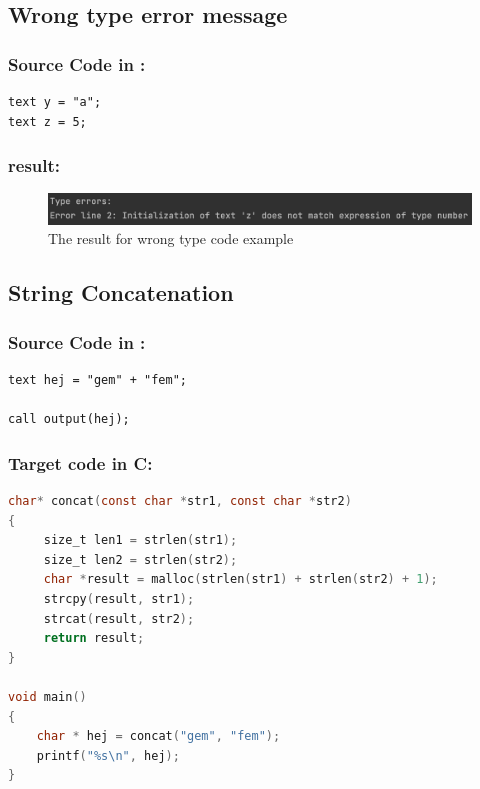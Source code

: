  \subsection{Wrong type error message} \label{test_TypeErr}
\subsubsection{Source Code in \lang:}
\begin{lstlisting}[language = scriptkid, firstnumber=1, label={list:acceptance_test_wrongtype}, caption=Acceptance wrong type code examples]
text y = "a";
text z = 5;
 \end{lstlisting}

 \subsubsection{result:}
\begin{figure}[H] 
    \begin{center}
        \includegraphics[width=1\textwidth]{Files/Billeder: Appendix/errormsg2.png}
    \end{center}
    \caption{The result for wrong type code example}
    \label{figure:errorMsg2_result}
\end{figure}


\subsection{String Concatenation} \label{test_stringconc}

\subsubsection{Source Code in \lang:}
\begin{lstlisting}[language = scriptkid, firstnumber=1, label={list:acceptance_test_stringconc}, caption=Acceptance test string conc code examples]
text hej = "gem" + "fem";

call output(hej);
\end{lstlisting}

\subsubsection{Target code in C:}
\begin{lstlisting}[language = C, firstnumber=1, label={list:acceptance_test_stringconc_output}, caption=Acceptance test string conc code examples in C]
char* concat(const char *str1, const char *str2) 
{
     size_t len1 = strlen(str1);
     size_t len2 = strlen(str2);
     char *result = malloc(strlen(str1) + strlen(str2) + 1);
     strcpy(result, str1);
     strcat(result, str2);
     return result;
}

void main()
{
    char * hej = concat("gem", "fem");
    printf("%s\n", hej);
}

\end{lstlisting}

